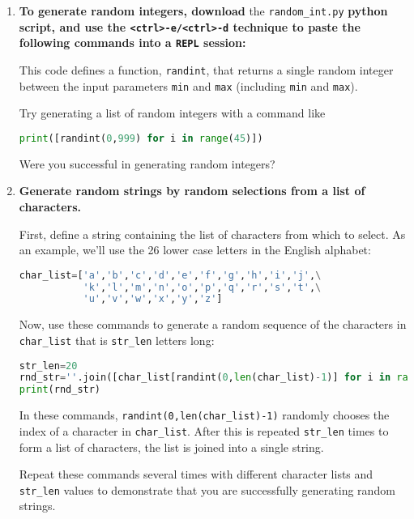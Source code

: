 \begin{enumerate}
	\item \textbf{To generate random integers, download} the \lstinline{random_int.py} \textbf{python script, and use the \lstinline{<ctrl>-e/<ctrl>-d} technique to paste the following commands into a \texttt{REPL} session:}
	
	
	This code defines a function, \lstinline{randint}, that returns a single random integer between the input parameters \texttt{min} and \texttt{max} (including \texttt{min} and \texttt{max}).
	
	Try generating a list of random integers with a command like
\begin{lstlisting}[language=Python]
print([randint(0,999) for i in range(45)])
\end{lstlisting}
	Were you successful in generating random integers?	

	\item \textbf{Generate random strings by random selections from a list of characters.}
	
	First, define a string containing the list of characters from which to select. 
	As an example, we'll use the 26 lower case letters in the English alphabet:
\begin{lstlisting}[language=Python]
char_list=['a','b','c','d','e','f','g','h','i','j',\
           'k','l','m','n','o','p','q','r','s','t',\
           'u','v','w','x','y','z']
\end{lstlisting}
	Now, use these commands to generate a random sequence of the characters in \lstinline{char_list} that is \lstinline{str_len} letters long:
\begin{lstlisting}[language=Python]
str_len=20
rnd_str=''.join([char_list[randint(0,len(char_list)-1)] for i in range(str_len)])
print(rnd_str)
\end{lstlisting}
	In these commands, \lstinline{randint(0,len(char_list)-1)} randomly chooses the index of a character in \lstinline{char_list}.
	After this is repeated \lstinline{str_len} times to form a list of characters, the list is joined into a single string.
		
	Repeat these commands several times with different character lists and \lstinline{str_len} values to demonstrate that you are successfully generating random strings.

\end{enumerate}



